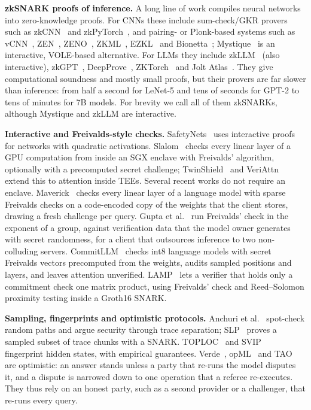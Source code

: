 \documentclass[sigconf,nonacm]{acmart}
\newcommand{\para}[1]{\par\noindent\textbf{#1}\quad}
\begin{document}
\para{zkSNARK proofs of inference.} A long line of work compiles neural networks into
zero-knowledge proofs. For CNNs these include sum-check/GKR provers~\cite{gkr} such as
zkCNN~\cite{zkcnn} and zkPyTorch~\cite{zkpytorch}, and pairing- or Plonk-based systems such as
vCNN~\cite{vcnn}, ZEN~\cite{zen}, ZENO~\cite{zeno}, ZKML~\cite{zkml}, EZKL~\cite{ezkl} and
Bionetta~\cite{bionetta}; Mystique~\cite{mystique} is an interactive, VOLE-based alternative.
For LLMs they include zkLLM~\cite{zkllm} (also interactive), zkGPT~\cite{zkgpt},
DeepProve~\cite{deepprove}, ZKTorch~\cite{zktorch} and Jolt Atlas~\cite{joltatlas}. They give
computational soundness and mostly small proofs, but their provers are far slower than
inference: from half a second for LeNet-5 and tens of seconds for GPT-2 to tens of minutes for 7B models.
For brevity we call all of them zkSNARKs, although Mystique and zkLLM are interactive.

\para{Interactive and Freivalds-style checks.} SafetyNets~\cite{safetynets} uses interactive proofs for networks
with quadratic activations. Slalom~\cite{slalom} checks every linear layer of a GPU computation
from inside an SGX enclave with Freivalds' algorithm, optionally with a precomputed secret
challenge; TwinShield~\cite{twinshield} and
VeriAttn~\cite{veriattn} extend this to attention inside TEEs. Several recent works do not
require an enclave. Maverick~\cite{maverick} checks every linear layer of a language model with sparse
Freivalds checks on a code-encoded copy of the weights that the client stores, drawing a fresh
challenge per query. Gupta et al.~\cite{gupta2026private} run Freivalds' check in the exponent of
a group, against verification data that the model owner generates with secret randomness, for a
client that outsources inference to two non-colluding servers. CommitLLM~\cite{commitllm2026}
checks int8 language models with secret Freivalds vectors precomputed from the weights, audits
sampled positions and layers, and leaves attention unverified. LAMP~\cite{lamp} lets a verifier
that holds only a commitment check one matrix product, using Freivalds' check and Reed--Solomon
proximity testing inside a Groth16 SNARK.

\para{Sampling, fingerprints and optimistic protocols.} Anchuri et
al.~\cite{anchuri2026verifiable} spot-check random paths and argue security through trace
separation; SLP~\cite{slp} proves a sampled subset of trace chunks with a SNARK. TOPLOC~\cite{toploc} and
SVIP~\cite{svip} fingerprint hidden states, with empirical guarantees. Verde~\cite{verde},
opML~\cite{opml} and TAO~\cite{tao} are optimistic: an answer stands unless a party that re-runs
the model disputes it, and a dispute is narrowed down to one operation that a referee re-executes.
They thus rely on an honest party, such as a second provider or a challenger, that re-runs every
query.
\end{document}
